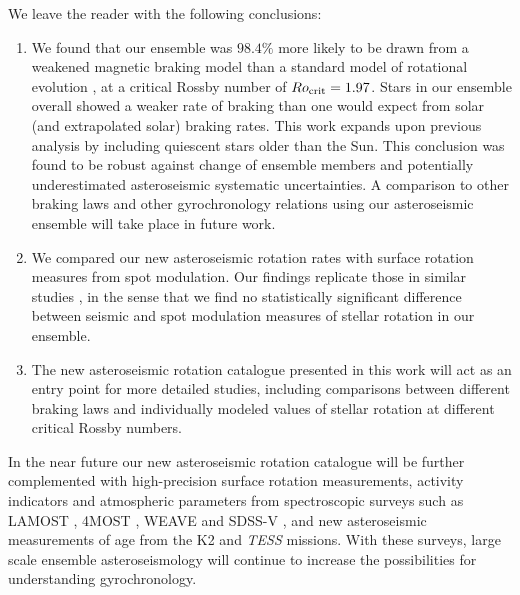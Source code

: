\documentclass[12pt]{article}
\newcommand{\tess}{\emph{TESS}\xspace}
\newcommand{\ktwo}{K2\xspace}
\newcommand{\rtwo}[1]{{#1}}
\begin{document}
We leave the reader with the following conclusions:
\begin{enumerate}
	\item We found that our ensemble was $98.4\%$ more likely to be drawn from a weakened magnetic braking model than a standard model of rotational evolution \cite{vansaders+pinsonneault2013}, at a critical Rossby number of $Ro_{\rm{crit}} = 1.97$. \rtwo{Stars in our ensemble overall showed a weaker rate of braking than one would expect from solar (and extrapolated solar) braking rates.} This work expands upon previous analysis \cite{vansaders+2019} by including quiescent stars older than the Sun. This conclusion was found to be robust against change of ensemble members and potentially underestimated asteroseismic systematic uncertainties. A comparison to other braking laws \cite{matt+2015} and other gyrochronology relations \cite{barnes2010} using our asteroseismic ensemble will take place in future work.
	
	\item We compared our new asteroseismic rotation rates with surface rotation measures from spot modulation. Our findings replicate those in similar studies \cite{nielsen+2015,benomar+2015}, in the sense that we find no statistically significant difference between seismic and spot modulation measures of stellar rotation in our ensemble.
	
	\item The new asteroseismic rotation catalogue presented in this work will act as an entry point for more detailed studies, including comparisons between different braking laws and individually modeled values of stellar rotation at different critical Rossby numbers.
	
\end{enumerate}

In the near future our new asteroseismic rotation catalogue will be further complemented with high-precision surface rotation measurements, activity indicators and atmospheric parameters from spectroscopic surveys such as LAMOST \cite{deng+2012}, 4MOST \cite{dejong+2014}, WEAVE \cite{dalton+2014} and SDSS-V \cite{blanton+2019, kollmeier+2019}, and new asteroseismic measurements of age from the \ktwo and \tess missions. With these surveys, large scale ensemble asteroseismology will continue to increase the possibilities for understanding gyrochronology.\\
\end{document}
